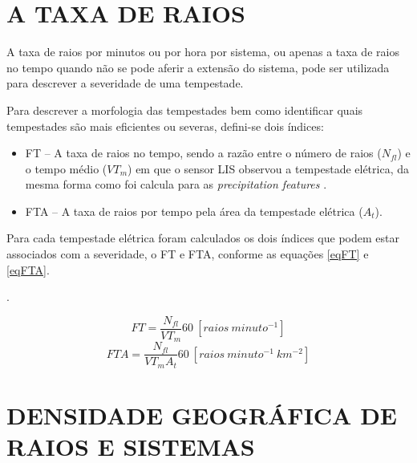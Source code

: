 \section{A TAXA DE RAIOS}
\label{metodoFtaFt}



A taxa de raios por minutos ou por hora por sistema, ou apenas a taxa de raios no tempo quando não se pode aferir a extensão do sistema,  pode ser utilizada para descrever a severidade de uma tempestade. 


Para descrever a morfologia das tempestades bem como identificar quais tempestades são mais eficientes ou severas, defini-se dois índices:

\begin{itemize}
\item FT -- A taxa de raios no tempo, sendo a razão entre o número de raios ($N_{fl}$) e o tempo médio ($VT_m$) em que o sensor LIS observou a tempestade elétrica, da mesma forma como foi calcula para as \textit{precipitation features} \cite{cecil2005, Nesbitt2000}. 

\item FTA -- A taxa de raios por tempo pela área da tempestade elétrica ($A_t$). 
\end{itemize}


Para cada tempestade elétrica foram calculados os dois índices que podem estar associados com a severidade, o FT e FTA, conforme as equações \ref{eqFT} e \ref{eqFTA}. 

 .

\begin{equation}
FT = \frac{N_{fl} }{VT_m} 60 ~[raios~minuto^{-1}]  
\label{eqFT}  
\end{equation}
\begin{equation}
FTA = \frac{N_{fl} }{VT_m A_t } 60 ~[raios~minuto^{-1}~km^{-2}]
\label{eqFTA}
\end{equation}

\section{DENSIDADE GEOGRÁFICA DE RAIOS E SISTEMAS}
\label{metodoPass}

